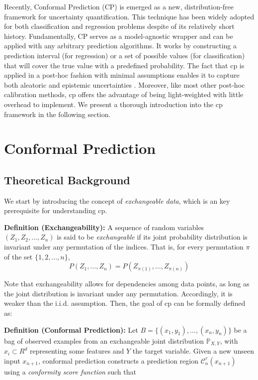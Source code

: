 Recently, Conformal Prediction (CP) \cite{shafer2008tutorial, vovk2005algorithmic} is emerged as a new, distribution-free framework for uncertainty quantification. This technique has been widely adopted for both classification and regression problems despite of its relatively short history. Fundamentally, CP serves as a model-agnostic wrapper and can be applied with any arbitrary prediction algorithms. It works by constructing a prediction interval (for regression) or a set of possible values (for classification) that will cover the true value with a predefined probability. The fact that \gls{cp} is applied in a post-hoc fashion with minimal assumptions enables it to capture both aleatoric and epistemic uncertainties \cite{mossina2024CVPR}. Moreover, like most other post-hoc calibration methods, \gls{cp} offers the advantage of being light-weighted with little overhead to implement. We present a thorough introduction into the \gls{cp} framework in the following section.

\section{Conformal Prediction}
\label{sec: reviewCP}
\subsection{Theoretical Background}
We start by introducing the concept of \textit{exchangeable data}, which is an key prerequisite for understanding \gls{cp}.
\newline

\noindent
\textbf{Definition (Exchangeability):}  
A sequence of random variables \( (Z_1, Z_2, \dots, Z_n) \) is said to be \textit{exchangeable} if its joint probability distribution is invariant under any permutation of the indices. That is, for every permutation \( \pi \) of the set \( \{1, 2, \dots, n\} \),
\[
P(Z_1, \dots, Z_n) = P(Z_{\pi(1)}, \dots, Z_{\pi(n)})
\]

\noindent Note that exchangeability allows for dependencies among data points, as long as the joint distribution is invariant under any permutation. Accordingly, it is weaker than the i.i.d. assumption. Then, the goal of \gls{cp} can be formally defined as: 
\newline

\noindent
\textbf{Definition (Conformal Prediction):}  Let \(B = \{(x_1, y_1), \dots, (x_n, y_n)\}\) be a bag of observed examples from an exchangeable joint distribution $\mathbb{P}_{X,Y}$, with $x_i \subset R^d$ representing some features and  $Y$ the target variable. Given a new unseen input \(x_{n+1}\), conformal prediction constructs a prediction region \( \mathcal{C}_n^\tau(x_{n+1}) \) using a \textit{conformity score function} such that
\vspace{0.7em}

